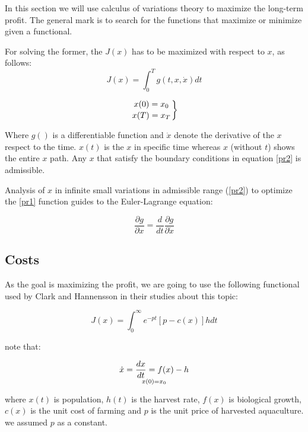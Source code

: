 In this section we will use calculus of variations theory to maximize the long-term profit. The general mark is to search for the functions that maximize or minimize given a functional.

For solving the former, the $J(x)$ has to be maximized with respect to $x$, as follows:
\begin{equation}
J(x) = \int_{0}^{T} g(t,x,\dot{x}) dt
\end{equation}
\label{pr1}

\begin{equation}
\left.
x(0) = x_{0} \atop
x(T)= x_{T} 
\right\}
\end{equation}
\label{pr2}

Where $g()$ is a differentiable function and  $\dot{x}$ denote the derivative of the $x$ respect to the time. $x(t)$ is the $x$ in specific time whereas $x$ (without $t$) shows the entire $x$ path. Any $x$ that satisfy the boundary conditions in equation \ref{pr2} is admissible.

Analysis of $x$ in infinite small variations in admissible range (\ref{pr2}) to optimize the \ref{pr1} function guides to the Euler-Lagrange equation:

\begin{equation}
\frac{\partial g}{\partial x} =\frac{d}{dt} \frac{\partial g}{\partial \dot{x}}
\end{equation}
\label{booo}

\subsection{Costs}

As the goal is maximizing the profit, we are going to use the following functional used by Clark and Hannensson in their studies about this topic:

\begin{equation}
J(x) = \int_{0}^{\infty} e^{-pt}[p-c(x)]h dt
\end{equation}
\label{pr3}

note that:

\begin{equation}
\dot{x}=\frac{dx}{dt}=f(x)-h \atop
x(0) = x_{0}
\end{equation}
\label{bb}

where $x(t)$ is population, $h(t)$ is the harvest rate, $f(x)$ is biological growth, $c(x)$ is the unit cost of farming and $p$ is the unit price of harvested aquaculture. we assumed $p$ as a constant.\

